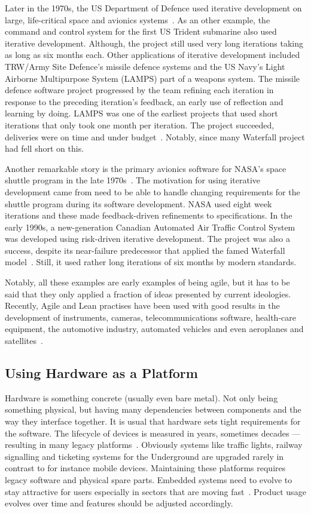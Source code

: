 \documentclass[english]{tktltiki2}
\begin{document}
Later in the 1970s, the US Department of Defence used iterative development on large, life-critical space and avionics systems~\cite{LB03}. As an other example, the command and control system for the first US Trident submarine also used iterative development. Although, the project still used very long iterations taking as long as six months each. Other applications of iterative development included TRW/Army Site Defence’s missile defence systems and the US Navy’s Light Airborne Multipurpose System (LAMPS) part of a weapons system. The missile defence software project progressed by the team refining each iteration in response to the preceding iteration’s feedback, an early use of reflection and learning by doing. LAMPS was one of the earliest projects that used short iterations that only took one month per iteration. The project succeeded, deliveries were on time and under budget~\cite{LB03}. Notably, since many Waterfall project had fell short on this.

Another remarkable story is the primary avionics software for NASA’s space shuttle program in the late 1970s~\cite{LB03}. The motivation for using iterative development came from need to be able to handle changing requirements for the shuttle program during its software development. NASA used eight week iterations and these made feedback-driven refinements to specifications. In the early 1990s, a new-generation Canadian Automated Air Traffic Control System was developed using risk-driven iterative development. The project was also a success, despite its near-failure predecessor that applied the famed Waterfall model~\cite{LB03}. Still, it used rather long iterations of six months by modern standards.

Notably, all these examples are early examples of being agile, but it has to be said that they only applied a fraction of ideas presented by current ideologies. Recently, Agile and Lean practises have been used with good results in the development of instruments, cameras, telecommunications software, health-care equipment, the automotive industry, automated vehicles and even aeroplanes and satellites~\cite{RA03, VB09, BE12, KRM13, HB14}.

\subsection{Using Hardware as a Platform}

Hardware is something concrete (usually even bare metal). Not only being something physical, but having many dependencies between components and the way they interface together. It is usual that hardware sets tight requirements for the software. The lifecycle of devices is measured in years, sometimes decades — resulting in many legacy platforms~\cite{BE12}. Obviously systems like traffic lights, railway signalling and ticketing systems for the Underground are upgraded rarely in contrast to for instance mobile devices. Maintaining these platforms requires legacy software and physical spare parts. Embedded systems need to evolve to stay attractive for users especially in sectors that are moving fast~\cite{BE12}. Product usage evolves over time and features should be adjusted accordingly.
\end{document}
